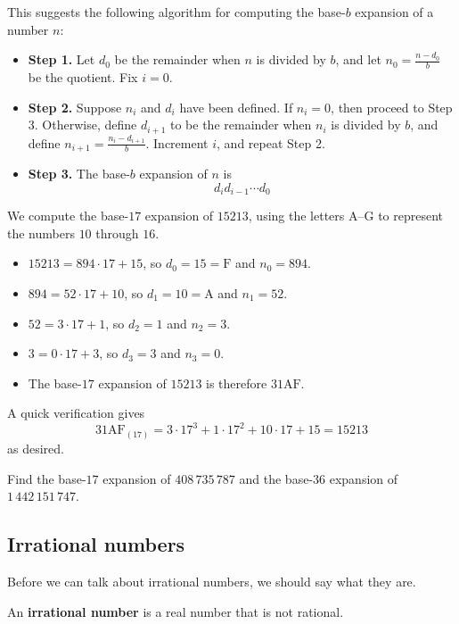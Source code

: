 This suggests the following algorithm for computing the base-$b$ expansion of a number $n$:
\begin{itemize}
\item \textbf{Step 1.} Let $d_0$ be the remainder when $n$ is divided by $b$, and let $n_0=\frac{n-d_0}{b}$ be the quotient. Fix $i=0$.
\item \textbf{Step 2.} Suppose $n_i$ and $d_i$ have been defined. If $n_i=0$, then proceed to Step 3. Otherwise, define $d_{i+1}$ to be the remainder when $n_i$ is divided by $b$, and define $n_{i+1} = \frac{n_i-d_{i+1}}{b}$. Increment $i$, and repeat Step 2.
\item \textbf{Step 3.} The base-$b$ expansion of $n$ is
\[ d_id_{i-1} \cdots d_0 \]
\end{itemize}

\begin{example}
We compute the base-$17$ expansion of $15213$, using the letters $\mathrm{A}$--$\mathrm{G}$ to represent the numbers $10$ through $16$.
\begin{itemize}
\item $15213 = 894 \cdot 17 + 15$, so $d_0=15=\mathrm{F}$ and $n_0=894$.
\item $894 = 52 \cdot 17 + 10$, so $d_1=10 = \mathrm{A}$ and $n_1=52$.
\item $52 = 3 \cdot 17 + 1$, so $d_2 = 1$ and $n_2=3$.
\item $3 = 0 \cdot 17 + 3$, so $d_3 = 3$ and $n_3=0$.
\item The base-$17$ expansion of $15213$ is therefore $31\mathrm{AF}$.
\end{itemize}
A quick verification gives
\[ 31\mathrm{AF}_{(17)} = 3 \cdot 17^3 + 1 \cdot 17^2 + 10 \cdot 17 + 15 = 15213 \]
as desired.
\end{example}

\begin{exercise}
Find the base-$17$ expansion of $408\,735\,787$ and the base-$36$ expansion of $1\,442\,151\,747$.
\end{exercise}


\subsection*{Irrational numbers}
\label{pGettingStartedIrationalNumbers}

Before we can talk about irrational numbers, we should say what they are.

\begin{definition}
\label{defIrrationalNumber}
An \textbf{irrational number} is a real number that is not rational.
\end{definition}

